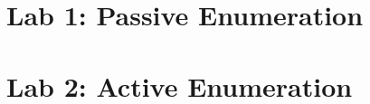 \documentclass[oneside,openright,titlepage,numbers=noenddot,headinclude,footinclude=true,cleardoublepage=empty,listof=totoc,paper=a4,fontsize=11pt,english,BCOR=5mm]{scrreprt}
\begin{document}
  \frenchspacing
  \raggedbottom{}

  \pagestyle{plain}

  \singlespacing{}
  

  \onehalfspacing{}
  

  \cleardoublepage{}
  \pagestyle{scrheadings}
  \onehalfspacing{}

  \chapter{Lab 1: Passive Enumeration}\label{c:Lab-1}
  

  \chapter{Lab 2: Active Enumeration}\label{c:Lab-2}
  








  \cleardoublepage{}
  \appendix

  \singlespacing{}
  
  \cleardoublepage{}
\end{document}
